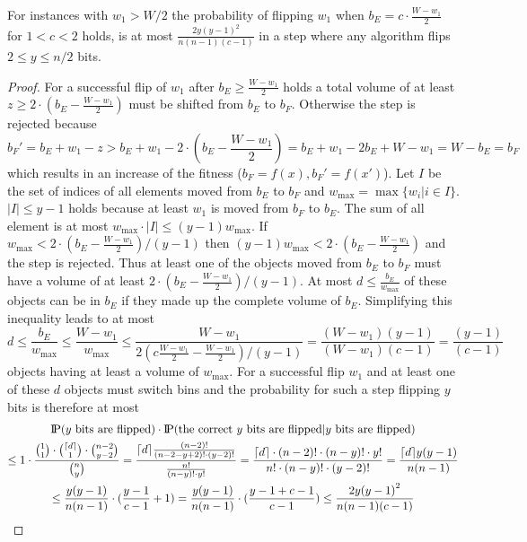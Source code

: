 \begin{lemma}\label{lemma:W1FlipWontHappen}
    For instances with $w_1>W/2$ the probability of flipping $w_1$ when $b_E = c\cdot\frac{W-w_1}{2}$ for $1<c<2$ holds, is at most \(\frac{2y{(y-1)}^2}{n(n-1)(c-1)}\) in a step where any algorithm flips $2\le y\le n/2$ bits.
\end{lemma}
\begin{proof}
    For a successful flip of $w_1$ after $b_E \ge \frac{W-w_1}{2}$ holds a total volume of at least $z\ge2\cdot(b_E-\frac{W-w_1}{2})$ must be shifted from $b_E$ to $b_F$.
    Otherwise the step is rejected because
    \[b_F'=b_E+w_1-z>b_E+w_1-2\cdot(b_E-\frac{W-w_1}{2})=b_E+w_1-2b_E+W-w_1=W-b_E=b_F\]
    which results in an increase of the fitness ($b_F = f(x), b_F' = f(x')$).
    Let $I$ be the set of indices of all elements moved from $b_E$ to $b_F$ and $w_{\max}=\max{\{w_i|i\in I\}}$.
    $|I|\le y-1$ holds because at least $w_1$ is moved from $b_F$ to $b_E$.
    The sum of all element is at most $w_{\max} \cdot |I| \le (y-1)w_{\max}$.
    If \(w_{\max}<2\cdot(b_E-\frac{W-w_1}{2})/(y-1)\) then \((y-1)w_{\max}<2\cdot(b_E-\frac{W-w_1}{2})\) and the step is rejected.
    Thus at least one of the objects moved from $b_E$ to $b_F$ must have a volume of at least $2\cdot(b_E-\frac{W-w_1}{2})/(y-1)$.
    At most \(d\le\frac{b_E}{w_{\max}}\) of these objects can be in $b_E$ if they made up the complete volume of $b_E$. Simplifying this inequality leads to at most
    \[
        d \le \frac{b_E}{w_{\max}}
        \le \frac{W-w_1}{w_{\max}}
        \le \frac{W-w_1}{2(c\frac{W-w_1}{2}-\frac{W-w_1}{2})/(y-1)}
        = \frac{(W-w_1)(y-1)}{(W-w_1)(c-1)}
        = \frac{(y-1)}{(c-1)}
    \]
    objects having at least a volume of $w_{\max}$.
    For a successful flip $w_1$ and at least one of these $d$ objects must switch bins and the probability for such a step flipping $y$ bits is therefore at most
    \begin{gather}
        \nonumber \text{I\kern-0.15em P}(y \text{ bits are flipped})\cdot\text{I\kern-0.15em P}(\text{the correct $y$ bits are flipped} | y \text{ bits are flipped})\\ \nonumber
        \le 1\cdot \frac{\binom{1}{1}\cdot\binom{\lceil d\rceil}{1}\cdot\binom{n-2}{y-2}}{\binom{n}{y}}
        =\frac{\lceil d\rceil\frac{(n-2)!}{(n-2-y+2)!\cdot (y-2)!}}{\frac{n!}{(n-y)!\cdot y!}}
        =\frac{\lceil d\rceil\cdot(n-2)!\cdot(n-y)!\cdot y!}{n!\cdot(n-y)!\cdot(y-2)!}
        = \frac{\lceil d\rceil y{(y-1)}}{n(n-1)}\\ \nonumber
        \le \frac{y{(y-1)}}{n(n-1)}\cdot(\frac{y-1}{c-1}+1)
        = \frac{y{(y-1)}}{n(n-1)}\cdot(\frac{y-1+c-1}{c-1})
        \le \frac{2y{(y-1)}^2}{n(n-1)(c-1)}
    \end{gather}
\end{proof}

